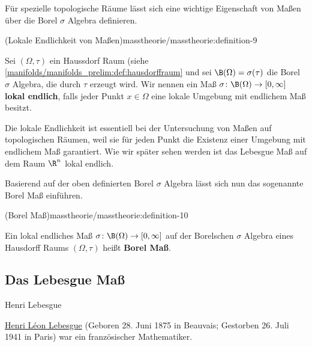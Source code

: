 \documentclass[letterpaper,10pt,english]{jupyterBook}
\begin{document}
\par
Für spezielle topologische Räume lässt sich eine wichtige Eigenschaft von Maßen über die Borel \(\sigma\) Algebra definieren.
\begin{definition}{(Lokale Endlichkeit von Maßen)}{masstheorie/masstheorie:definition-9}



\par
Sei \((\Omega, \tau)\) ein Haussdorf Raum (siehe \cref{manifolds/manifolds_prelim:def:hausdorffraum}  und sei \(\B(\Omega) = \sigma(\tau)\) die Borel \(\sigma\) Algebra, die durch \(\tau\) erzeugt wird.
Wir nennen ein Maß \(\sigma \colon \B(\Omega) \rightarrow [0, \infty]\) \textbf{lokal endlich}, falls jeder Punkt \(x \in \Omega\) eine lokale Umgebung mit endlichem Maß besitzt.
\end{definition}

\par
Die lokale Endlichkeit ist essentiell bei der Untersuchung von Maßen auf topologischen Räumen, weil sie für jeden Punkt die Existenz einer Umgebung mit endlichem Maß garantiert.
Wie wir später sehen werden ist das Lebesgue Maß auf dem Raum \(\R^n\) lokal endlich.

\par
Basierend auf der oben definierten Borel \(\sigma\) Algebra lässt sich nun das sogenannte Borel Maß einführen.
\begin{definition}{(Borel Maß)}{masstheorie/masstheorie:definition-10}



\par
Ein lokal endliches Maß \(\sigma \colon \B(\Omega) \rightarrow [0, \infty]\) auf der Borelschen \(\sigma\) Algebra eines Hausdorff Raums \((\Omega,\tau)\) heißt \textbf{Borel Maß}.
\end{definition}


\subsection{Das Lebesgue Maß}
\label{\detokenize{masstheorie/masstheorie:das-lebesgue-masz}}
\begin{emphBox}{Henri Lebesgue}{}

\par
\href{https://en.wikipedia.org/wiki/Henri\_Lebesgue}{Henri Léon Lebesgue} (Geboren 28. Juni 1875 in Beauvais; Gestorben 26. Juli 1941 in Paris) war ein französischer Mathematiker.
\end{emphBox}
\end{document}
